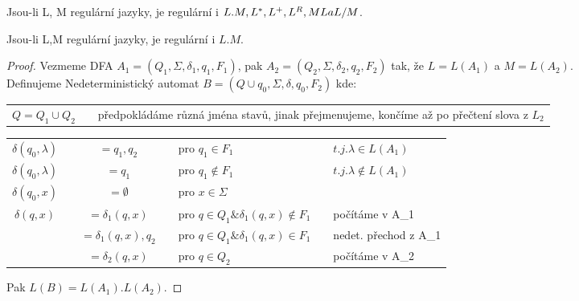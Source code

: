 \documentclass[../main.tex]{subfiles}
\begin{document}
\begin{theorem}
    Jsou-li L, M regulární jazyky, je regulární i $L.M, L^*,L^+, L^R, M\\L a L/M$.
\end{theorem}
\begin{theorem}
    Jsou-li L,M regulární jazyky, je regulární i $L.M$.
\end{theorem}
\begin{proof}
    Vezmeme DFA $A_1 = (Q_1,\Sigma, \delta_1, q_1, F_1)$, pak $A_2 = (Q_2,\Sigma, \delta_2,q_2,F_2)$ tak, že $L = L(A_1)$ a $M = L(A_2).$
    \\ Definujeme Nedeterministický automat $B = (Q\cup {q_0},\Sigma, \delta, q_0,F_2)$ kde:

    \begin{tabular}{l r}
        $Q = Q_1 \cup Q_2$ && předpokládáme různá jména stavů, jinak přejmenujeme, končíme až po přečtení slova z $L_2$ \\        
    \end{tabular}
    \begin{tabular}{c c c c}
        $\delta(q_0,\lambda)$ && $={q_1,q_2}$ && pro $q_1 \in F_1$ && $t.j. \lambda \in L(A_1)$ \\
        $\delta(q_0,\lambda)$ && $={q_1}$ && pro $q_1 \notin F_1$ && $t.j. \lambda \notin L(A_1)$ \\
        $\delta(q_0,x)$ && $=\emptyset$ && pro $x \in \Sigma$ && \space \\
        $\delta(q,x)$ && $={\delta_1(q,x)}$ && pro $q \in Q_1 \& \delta_1(q,x) \notin F_1$ && počítáme v A_1\\
        \space && $={\delta_1(q,x),q_2}$ && pro $q \in Q_1 \& \delta_1(q,x) \in F_1$ && nedet. přechod z A_1\\
        \space && $={\delta_2(q,x)}$ && pro $q \in Q_2$  && počítáme v A_2\\
    \end{tabular}
    Pak $L(B) = L(A_1).L(A_2)$.
\end{proof}
\end{document}
